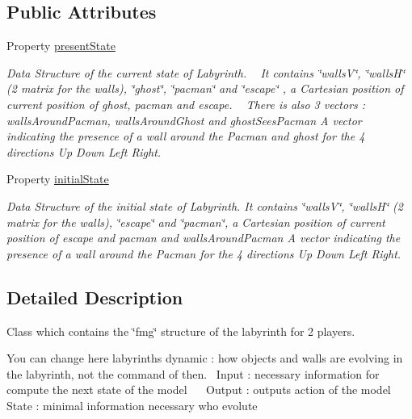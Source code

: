 \subsection*{Public Attributes}
\begin{DoxyCompactItemize}
\item 
Property \hyperlink{class_model_laby_a9624cc7c421a50fa5086b0ebd0cd5fe3}{present\+State}
\begin{DoxyCompactList}\small\item\em Data Structure of the current state of Labyrinth. ~\newline
 It contains \char`\"{}walls\+V\char`\"{}, \char`\"{}walls\+H\char`\"{} (2 matrix for the walls), \char`\"{}ghost\char`\"{}, \char`\"{}pacman\char`\"{} and \char`\"{}escape\char`\"{} , a Cartesian position of current position of ghost, pacman and escape. ~\newline
 There is also 3 vectors \+: \textquotesingle{}walls\+Around\+Pacman\textquotesingle{}, \textquotesingle{}walls\+Around\+Ghost\textquotesingle{} and \textquotesingle{}ghost\+Sees\+Pacman\textquotesingle{} A vector indicating the presence of a wall around the Pacman and ghost for the 4 directions Up Down Left Right. \end{DoxyCompactList}\item 
Property \hyperlink{class_model_laby_acd9263acfa96c9138afdf497e55acc24}{initial\+State}
\begin{DoxyCompactList}\small\item\em Data Structure of the initial state of Labyrinth. It contains \char`\"{}walls\+V\char`\"{}, \char`\"{}walls\+H\char`\"{} (2 matrix for the walls), \char`\"{}escape\char`\"{} and \char`\"{}pacman\char`\"{}, a Cartesian position of current position of escape and pacman and \textquotesingle{}walls\+Around\+Pacman\textquotesingle{} A vector indicating the presence of a wall around the Pacman for the 4 directions Up Down Left Right. \end{DoxyCompactList}\end{DoxyCompactItemize}


\subsection{Detailed Description}
Class which contains the \char`\"{}fmg\char`\"{} structure of the labyrinth for 2 players. 

You can change here labyrinth\textquotesingle{}s dynamic \+: how objects and walls are evolving in the labyrinth, not the command of then.~\newline
 Input \+: necessary information for compute the next state of the model~\newline
~\newline
 Output \+: output\textquotesingle{}s action of the model~\newline
 ~\newline
 State \+: minimal information necessary who evolute 

